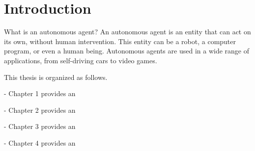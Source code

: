 \chapter{Introduction}
\label{cha:examples}

What is an autonomous agent? An autonomous agent is an entity that can act on its
own, without human intervention. This entity can be a robot, a computer program,
or even a human being. Autonomous agents are used in a wide range of
applications, from self-driving cars to video games.

This thesis is organized as follows.

- Chapter 1 provides an

- Chapter 2 provides an

- Chapter 3 provides an

- Chapter 4 provides an